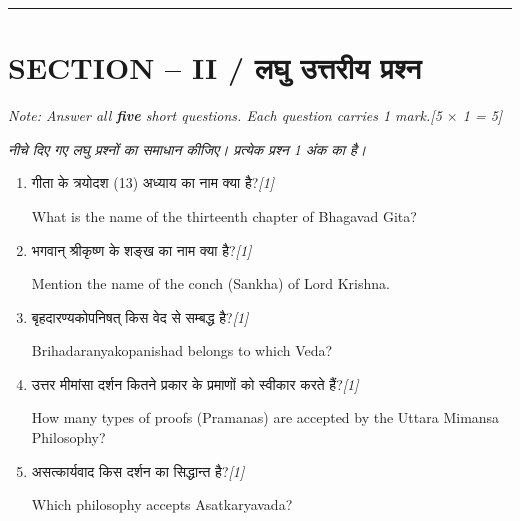 \documentclass[11pt,a4paper]{article}
\newcommand{\pts}[1]{\hfill \textit{[#1]}}
\begin{document}
\bigskip
\rule{\linewidth}{0.4pt}
\bigskip

\section*{SECTION -- II / लघु उत्तरीय प्रश्न}
\noindent \textit{Note: Answer all \textbf{five} short questions. Each question carries 1 mark.}\pts{5 $\times$ 1 = 5}

\noindent \textit{नीचे दिए गए लघु प्रश्नों का समाधान कीजिए। प्रत्येक प्रश्न 1 अंक का है।}

\bigskip

\begin{enumerate}[label=\textbf{\arabic*.},leftmargin=*,itemsep=10pt]

  \item गीता के त्रयोदश (13) अध्याय का नाम क्या है?\pts{1}
  
  What is the name of the thirteenth chapter of Bhagavad Gita?

  \item भगवान् श्रीकृष्ण के शङ्ख का नाम क्या है?\pts{1}
  
  Mention the name of the conch (Sankha) of Lord Krishna.

  \item बृहदारण्यकोपनिषत् किस वेद से सम्बद्ध है?\pts{1}
  
  Brihadaranyakopanishad belongs to which Veda?

  \item उत्तर मीमांसा दर्शन कितने प्रकार के प्रमाणों को स्वीकार करते हैं?\pts{1}
  
  How many types of proofs (Pramanas) are accepted by the Uttara Mimansa Philosophy?

  \item असत्कार्यवाद किस दर्शन का सिद्धान्त है?\pts{1}
  
  Which philosophy accepts Asatkaryavada?

\end{enumerate}
\end{document}
